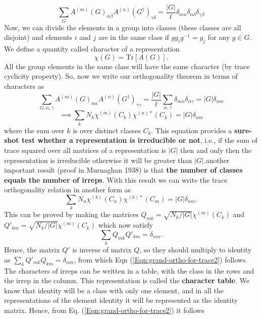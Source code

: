 \documentclass{article}
\begin{document}
\begin{equation}
	\sum_{G}A^{(m)}(G)_{\alpha \beta}  A^{(n)}(G^\dagger)_{\gamma \delta} = \frac{|G|}{\ell} \delta_{mn}\delta_{\alpha \delta} \delta_{\gamma \beta}
\end{equation}
	Now, we can divide the elements in a group into classes (these classes are all disjoint) and elements $i$ and $j$ are in the same class if $gg_i g^{-1} = g_j$ for any $g \in G$. We define a quantity called character of a representation 
	\begin{equation}
		\chi (G) = \mathrm{Tr}[A(G)].
	\end{equation}
	All the group elements in the same class will have the same character (by trace cyclicity property). So, now we write our orthogonality theorem in terms of characters as
	\begin{equation}
		\sum_{G, \alpha , \gamma}A^{(m)}(G)_{\alpha \alpha}  A^{(n)}(G^\dagger)_{\gamma \gamma} = \frac{|G|}{\ell} \sum_{\alpha , \gamma}\delta_{mn}\delta_{\alpha \gamma} = |G| \delta_{nm}
	\end{equation}
	\begin{equation}\label{Eqn:grand-ortho-for-trace1}
		\implies \sum_k N_k \chi^{(m)}(C_k)\chi^{(n)*}(C_k) = |G| \delta_{nm}
	\end{equation}
	where the sum over $k$ is over distinct classes $C_k$. This equation provides a\textbf{ sure-shot test whether a representation is irreducible or not}, i.e., if the sum of trace squared over all matrices of a representation is $|G|$ then and only then the representation is irreducible otherwise it will be greater than $|G|$.another important result (proof in Murnaghan 1938) is that \textbf{the number of classes equals the number of irreps}. With this result we can write the trace orthogonality relation in another form as
	\begin{equation}\label{Eqn:grand-ortho-for-trace2}
		\sum_k N_n \chi^{(k)}(C_n)\chi^{(k)*}(C_m) = |G| \delta_{nm}.
	\end{equation}
	This can be proved by making the matrices $Q_{mk} = \sqrt{N_k / |G|} \chi^{(m)}(C_k)$ and $Q'_{km} = \sqrt{N_k / |G|} \chi^{(m)}(C_k)$ which now satisfy
	\begin{equation}
		\sum_k Q_{mk} Q'_{km} = \delta_{nm}.
	\end{equation}
	Hence, the matrix $Q'$ is inverse of matrix $Q$, so they should multiply to identity as $\sum_k Q'_{mk} Q_{km} = \delta_{nm}$, from which Eqn (\ref{Eqn:grand-ortho-for-trace2}) follows. The characters of irreps can be written in a table, with the class in the rows and the irrep in the column. This representation is called the \textbf{character table}. We know that identity will be a class with only one element, and in all the representations of the element identity it will be represented as the identity matrix. Hence, from Eq. (\ref{Eqn:grand-ortho-for-trace2}) it follows
\end{document}
